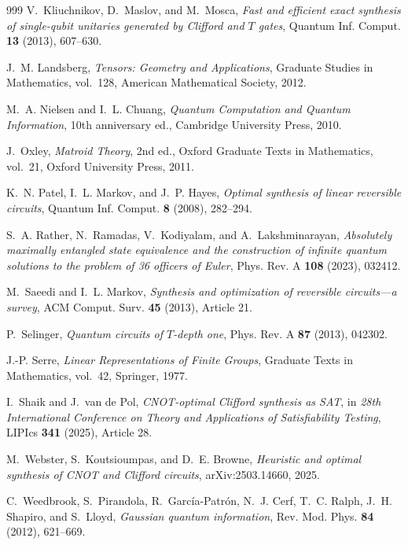 \begin{thebibliography}{999}
V.~Kliuchnikov, D.~Maslov, and M.~Mosca,
\emph{Fast and efficient exact synthesis of single-qubit unitaries generated by Clifford and $T$ gates},
Quantum Inf. Comput. \textbf{13} (2013), 607--630.


J.~M. Landsberg,
\emph{Tensors: Geometry and Applications},
Graduate Studies in Mathematics, vol.~128, American Mathematical Society, 2012.


M.~A. Nielsen and I.~L. Chuang,
\emph{Quantum Computation and Quantum Information}, 10th anniversary ed.,
Cambridge University Press, 2010.


J.~Oxley,
\emph{Matroid Theory}, 2nd ed.,
Oxford Graduate Texts in Mathematics, vol.~21, Oxford University Press, 2011.


K.~N. Patel, I.~L. Markov, and J.~P. Hayes,
\emph{Optimal synthesis of linear reversible circuits},
Quantum Inf. Comput. \textbf{8} (2008), 282--294.


S.~A. Rather, N.~Ramadas, V.~Kodiyalam, and A.~Lakshminarayan,
\emph{Absolutely maximally entangled state equivalence and the construction of infinite quantum solutions to the problem of 36 officers of Euler},
Phys. Rev. A \textbf{108} (2023), 032412.


M.~Saeedi and I.~L. Markov,
\emph{Synthesis and optimization of reversible circuits---a survey},
ACM Comput. Surv. \textbf{45} (2013), Article 21.


P.~Selinger,
\emph{Quantum circuits of $T$-depth one},
Phys. Rev. A \textbf{87} (2013), 042302.


J.-P. Serre,
\emph{Linear Representations of Finite Groups},
Graduate Texts in Mathematics, vol.~42, Springer, 1977.


I.~Shaik and J.~van de Pol,
\emph{CNOT-optimal Clifford synthesis as SAT},
in \emph{28th International Conference on Theory and Applications of Satisfiability Testing},
LIPIcs \textbf{341} (2025), Article 28.


M.~Webster, S.~Koutsioumpas, and D.~E. Browne,
\emph{Heuristic and optimal synthesis of CNOT and Clifford circuits},
arXiv:2503.14660, 2025.


C.~Weedbrook, S.~Pirandola, R.~Garc\'ia-Patr\'on, N.~J. Cerf, T.~C. Ralph, J.~H. Shapiro, and S.~Lloyd,
\emph{Gaussian quantum information},
Rev. Mod. Phys. \textbf{84} (2012), 621--669.




\end{thebibliography}
